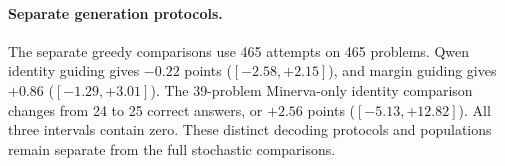 \paragraph{Separate generation protocols.}
The separate greedy comparisons use 465 attempts on 465 problems.
Qwen identity guiding gives $-0.22$ points ($[-2.58,+2.15]$), and
margin guiding gives $+0.86$ ($[-1.29,+3.01]$). The 39-problem
Minerva-only identity comparison changes from 24 to 25 correct answers,
or $+2.56$ points ($[-5.13,+12.82]$). All three intervals contain zero.
These distinct decoding protocols and populations remain separate from
the full stochastic comparisons.
